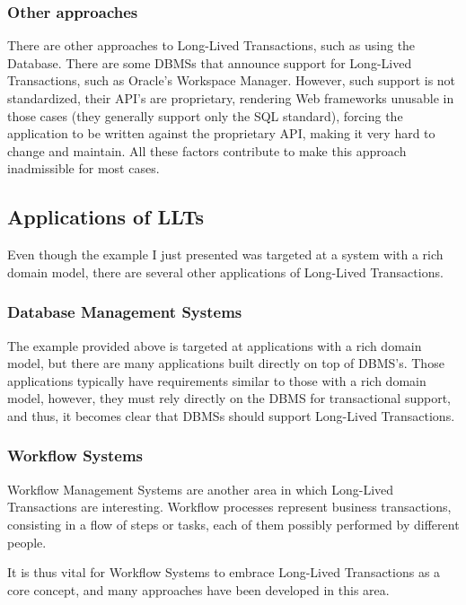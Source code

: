 \documentclass{llncs}
\begin{document}
\subsubsection{Other approaches}

There are other approaches to Long-Lived Transactions, such as using
the Database. There are some DBMSs that announce support for
Long-Lived Transactions, such as Oracle's Workspace Manager. However,
such support is not standardized, their API's are proprietary,
rendering Web frameworks unusable in those cases (they generally
support only the SQL standard), forcing the application to be written
against the proprietary API, making it very hard to change and
maintain. All these factors contribute to make this approach
inadmissible for most cases.

\subsection{Applications of LLTs}

Even though the example I just presented was targeted at a system with
a rich domain model, there are several other applications of
Long-Lived Transactions.

\subsubsection{Database Management Systems}

The example provided above is targeted at applications with a rich
domain model, but there are many applications built directly on top of
DBMS's. Those applications typically have requirements similar to
those with a rich domain model, however, they must rely directly on
the DBMS for transactional support, and thus, it becomes clear that
DBMSs should support Long-Lived Transactions.

\subsubsection{Workflow Systems}

Workflow Management Systems are another area in which Long-Lived
Transactions are interesting. Workflow processes represent business
transactions, consisting in a flow of steps or tasks, each of them
possibly performed by different people.

It is thus vital for Workflow Systems to embrace Long-Lived
Transactions as a core concept, and many approaches have been
developed in this area.
\end{document}
